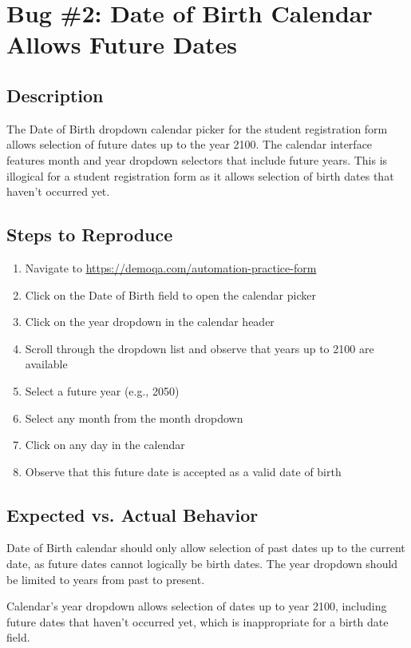 \section{Bug \#2: Date of Birth Calendar Allows Future Dates}


\subsection*{Description}
The Date of Birth dropdown calendar picker for the student registration form allows selection of future dates up to the year 2100. The calendar interface features month and year dropdown selectors that include future years. This is illogical for a student registration form as it allows selection of birth dates that haven't occurred yet.

\subsection*{Steps to Reproduce}
\begin{enumerate}
    \item Navigate to \url{https://demoqa.com/automation-practice-form}
    \item Click on the Date of Birth field to open the calendar picker
    \item Click on the year dropdown in the calendar header
    \item Scroll through the dropdown list and observe that years up to 2100 are available
    \item Select a future year (e.g., 2050)
    \item Select any month from the month dropdown
    \item Click on any day in the calendar
    \item Observe that this future date is accepted as a valid date of birth
\end{enumerate}

\subsection*{Expected vs. Actual Behavior}
\begin{tcolorbox}[colback=gray!10, colframe=gray!40, title=Expected Behavior]
Date of Birth calendar should only allow selection of past dates up to the current date, as future dates cannot logically be birth dates. The year dropdown should be limited to years from past to present.
\end{tcolorbox}

\begin{tcolorbox}[colback=gray!10, colframe=gray!40, title=Actual Behavior]
Calendar's year dropdown allows selection of dates up to year 2100, including future dates that haven't occurred yet, which is inappropriate for a birth date field.
\end{tcolorbox}

